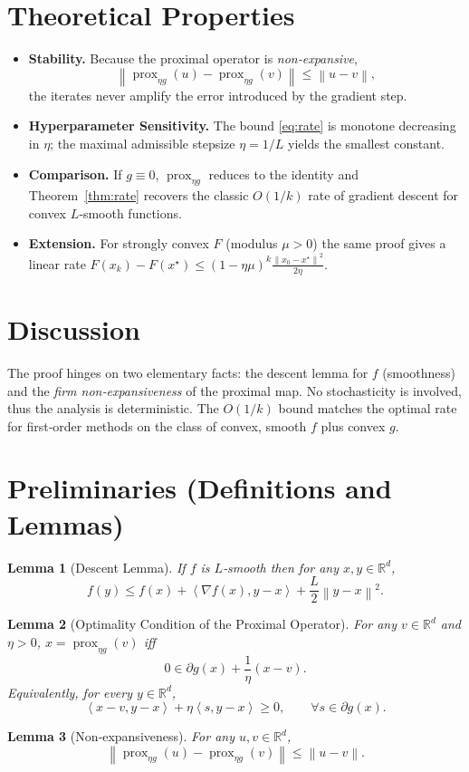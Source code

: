\documentclass{article}
\newtheorem{lemma}{Lemma}
\newcommand{\prox}{\operatorname{prox}}
\newcommand{\grad}{\nabla}
\newcommand{\R}{\mathbb{R}}
\newcommand{\norm}[1]{\left\lVert #1 \right\rVert}
\newcommand{\inner}[2]{\left\langle #1,#2 \right\rangle}
\begin{document}
\section*{Theoretical Properties}
\begin{itemize}[noitemsep]
\item \textbf{Stability.} Because the proximal operator is \emph{non‑expansive},
\[
\norm{\prox_{\eta g}(u)-\prox_{\eta g}(v)}\le\norm{u-v},
\]
the iterates never amplify the error introduced by the gradient step.
\item \textbf{Hyperparameter Sensitivity.} The bound \eqref{eq:rate} is monotone decreasing in $\eta$; the maximal admissible stepsize $\eta=1/L$ yields the smallest constant.
\item \textbf{Comparison.} If $g\equiv0$, $\prox_{\eta g}$ reduces to the identity and Theorem~\ref{thm:rate} recovers the classic $O(1/k)$ rate of gradient descent for convex $L$‑smooth functions.
\item \textbf{Extension.} For strongly convex $F$ (modulus $\mu>0$) the same proof gives a linear rate $F(x_{k})-F(x^{\star})\le (1-\eta\mu)^{k}\frac{\norm{x_{0}-x^{\star}}^{2}}{2\eta}$.
\end{itemize}

\section*{Discussion}
The proof hinges on two elementary facts: the descent lemma for $f$ (smoothness) and the \emph{firm non‑expansiveness} of the proximal map. No stochasticity is involved, thus the analysis is deterministic. The $O(1/k)$ bound matches the optimal rate for first‑order methods on the class of convex, smooth $f$ plus convex $g$.

\newpage
\section*{Preliminaries (Definitions and Lemmas)}
\begin{lemma}[Descent Lemma]\label{lem:descent}
If $f$ is $L$‑smooth then for any $x,y\in\R^{d}$,
\[
f(y)\le f(x)+\inner{\grad f(x)}{y-x}+\frac{L}{2}\norm{y-x}^{2}.
\]
\end{lemma}
\begin{lemma}[Optimality Condition of the Proximal Operator]\label{lem:prox_opt}
For any $v\in\R^{d}$ and $\eta>0$, $x=\prox_{\eta g}(v)$ iff
\[
0\in\partial g(x)+\frac{1}{\eta}(x-v).
\]
Equivalently, for every $y\in\R^{d}$,
\begin{equation}\label{eq:prox_opt}
\inner{x-v}{y-x}+\eta\inner{s}{y-x}\ge0,\qquad\forall s\in\partial g(x).
\end{equation}
\end{lemma}
\begin{lemma}[Non‑expansiveness]\label{lem:nonexp}
For any $u,v\in\R^{d}$,
\[
\norm{\prox_{\eta g}(u)-\prox_{\eta g}(v)}\le\norm{u-v}.
\]
\end{lemma}
\end{document}
